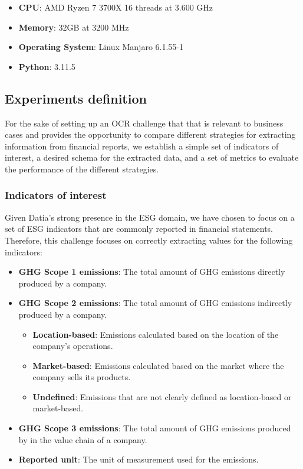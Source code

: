 \documentclass[english, 12pt, a4paper, elec, utf8, a-2b, online]{aaltothesis}
\begin{document}
\begin{itemize}
    \item \textbf{CPU}: AMD Ryzen 7 3700X 16 threads at 3.600 GHz
    \item \textbf{Memory}: 32GB at 3200 MHz
    \item \textbf{Operating System}: Linux Manjaro 6.1.55-1
    \item \textbf{Python}: 3.11.5
\end{itemize}

\subsection{Experiments definition}

For the sake of setting up an \ac{OCR} challenge that that is relevant to business cases and provides the opportunity to compare different strategies for extracting information from financial reports, we establish a simple set of indicators of interest, a desired schema for the extracted data, and a set of metrics to evaluate the performance of the different strategies.

\subsubsection{Indicators of interest}

Given Datia's strong presence in the \ac{ESG} domain, we have chosen to focus on a set of \ac{ESG} indicators that are commonly reported in financial statements.
Therefore, this challenge focuses on correctly extracting values for the following indicators:

\begin{itemize}
    \item \textbf{\ac{GHG} Scope 1 emissions}: The total amount of \ac{GHG} emissions directly produced by a company.
    \item \textbf{\ac{GHG} Scope 2 emissions}: The total amount of \ac{GHG} emissions indirectly produced by a company.
            \begin{itemize}
                \item \textbf{Location-based}: Emissions calculated based on the location of the company's operations.
                \item \textbf{Market-based}: Emissions calculated based on the market where the company sells its products.
                \item \textbf{Undefined}: Emissions that are not clearly defined as location-based or market-based.
            \end{itemize}
    \item \textbf{\ac{GHG} Scope 3 emissions}: The total amount of \ac{GHG} emissions produced by in the value chain of a company.
    \item \textbf{Reported unit}: The unit of measurement used for the emissions.
\end{itemize}
\end{document}
